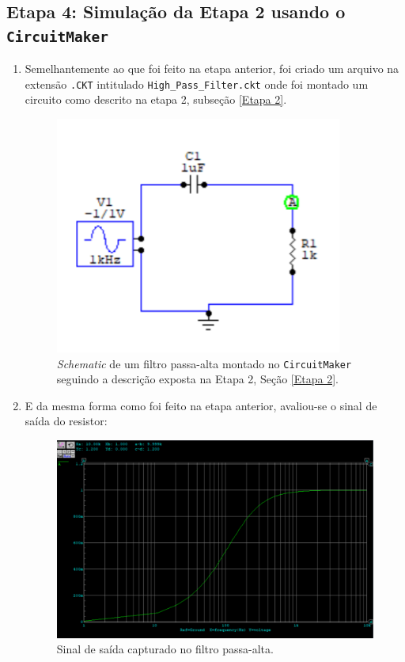 \documentclass[letterpaper, 12pt]{article}
\begin{document}
\subsection{Etapa 4: Simulação da Etapa 2 usando o \texttt{CircuitMaker}}
\begin{enumerate}
    \item Semelhantemente ao que foi feito na etapa anterior, foi criado um arquivo na extensão \texttt{.CKT} intitulado \texttt{High\_Pass\_Filter.ckt} onde foi montado um circuito como descrito na etapa 2, subseção \ref{Etapa 2}.
    \begin{figure}[h]
        \centering
        \includegraphics[width=0.5\linewidth]{figures/High_pass.png}
        \caption{{\it Schematic} de um filtro passa-alta montado no \texttt{CircuitMaker} seguindo a descrição exposta na Etapa 2, Seção \ref{Etapa 2}.}
        \label{RC_Circuit_Integrator}
    \end{figure}
    
    \item E da mesma forma como foi feito na etapa anterior, avaliou-se o sinal de saída do resistor:
    \begin{figure}[h]
        \centering
        \includegraphics[width=0.5\linewidth]{figures/High_pass_filter.png}
        \caption{Sinal de saída capturado no filtro passa-alta.}
        \label{RC_Circuit_Resistor}
    \end{figure}
    
\end{enumerate}


\end{document}
